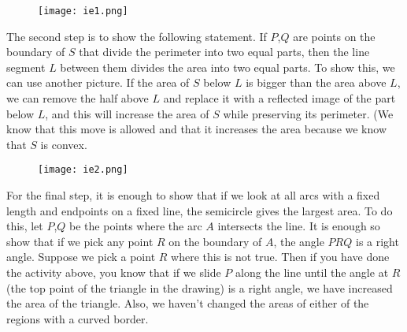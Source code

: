 \begin{figure}[H]
   \centering
   \texttt{[image: ie1.png]} 
\end{figure}

The second step is to show the following statement. If $P$,$Q$ are points on the boundary of $S$ that divide the perimeter into two equal parts, then the line segment $L$ between them divides the area into two equal parts. To show this, we can use another picture. If the area of $S$ below $L$ is bigger than the area above $L$, we can remove the half above $L$ and replace it with a reflected image of the part below $L$, and this will increase the area of $S$ while preserving its perimeter. (We know that this move is allowed and that it increases the area because we know that $S$ is convex. \\

\begin{figure}[H]
   \centering
   \texttt{[image: ie2.png]} 
\end{figure}

 \vspace{0.2cm}

For the final step, it is enough to show that if we look at all arcs with a fixed length and endpoints on a fixed line, the semicircle gives the largest area. To do this, let $P$,$Q$ be the points where the arc $A$ intersects the line. It is enough so show that if we pick any point $R$ on the boundary of $A$, the angle $PRQ$ is a right angle. Suppose we pick a point $R$ where this is not true. Then if you have done the activity above, you know that if we slide $P$ along the line until the angle at $R$ (the top point of the triangle in the drawing) is a right angle, we have increased the area of the triangle. Also, we haven't changed the areas of either of the regions with a curved border.

